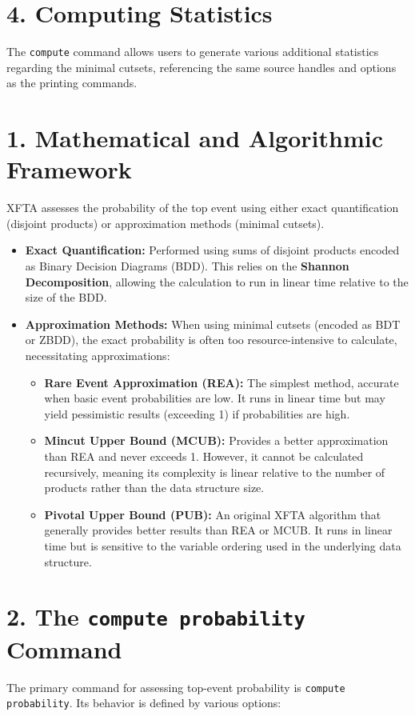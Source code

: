 \section*{4. Computing Statistics}
The \texttt{compute} command allows users to generate various additional statistics regarding the minimal cutsets, referencing the same source handles and options as the printing commands.

\section*{1. Mathematical and Algorithmic Framework}
XFTA assesses the probability of the top event using either exact quantification (disjoint products) or approximation methods (minimal cutsets).

\begin{itemize}
    \item \textbf{Exact Quantification:} Performed using sums of disjoint products encoded as Binary Decision Diagrams (BDD). This relies on the \textbf{Shannon Decomposition}, allowing the calculation to run in linear time relative to the size of the BDD.
    \item \textbf{Approximation Methods:} When using minimal cutsets (encoded as BDT or ZBDD), the exact probability is often too resource-intensive to calculate, necessitating approximations:
    \begin{itemize}
        \item \textbf{Rare Event Approximation (REA):} The simplest method, accurate when basic event probabilities are low. It runs in linear time but may yield pessimistic results (exceeding 1) if probabilities are high.
        \item \textbf{Mincut Upper Bound (MCUB):} Provides a better approximation than REA and never exceeds 1. However, it cannot be calculated recursively, meaning its complexity is linear relative to the number of products rather than the data structure size.
        \item \textbf{Pivotal Upper Bound (PUB):} An original XFTA algorithm that generally provides better results than REA or MCUB. It runs in linear time but is sensitive to the variable ordering used in the underlying data structure.
    \end{itemize}
\end{itemize}

\section*{2. The \texttt{compute probability} Command}
The primary command for assessing top-event probability is \texttt{compute probability}. Its behavior is defined by various options:

